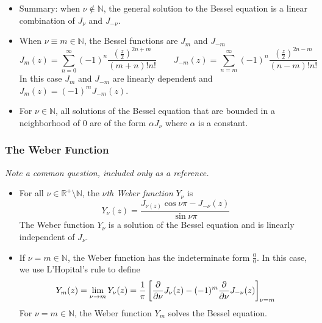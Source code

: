\documentclass[11pt, a4paper]{article}
\newcommand{\question}[1]{\textit{#1}\vspace{2mm}}
\newcommand{\R}{\mathbb{R}} %
\begin{document}
\begin{itemize}
	\item Summary: when $ \nu \notin \mathbb{N}  $, the general solution to the Bessel equation is a linear combination of $ J_{\nu} $ and $ J_{-\nu} $.
	
	\item When $ \nu \equiv m \in \mathbb{N} $, the Bessel functions are $ J_{m} $ and $ J_{-m} $
	\begin{equation*}
		J_{m}(z) = \sum_{n=0}^{\infty}(-1)^{n} \frac{\left (\frac{z}{2}\right )^{2n + m}}{(m+n)!n!} \qquad J_{-m}(z) = \sum_{n=m}^{\infty}(-1)^{n} \frac{\left (\frac{z}{2}\right )^{2n - m}}{(n-m)!n!}
	\end{equation*}
	In this case $ J_{m} $ and $ J_{-m} $ are linearly dependent and $ J_{m}(z) = (-1)^{m}J_{-m}(z)$.
	
	\item For $ \nu \in \mathbb{N} $, all solutions of the Bessel equation that are bounded in a neighborhood of 0 are of the form $ \alpha J_{\nu} $ where $ \alpha $ is a constant.
	
\end{itemize}


\subsubsection{The Weber Function}
\question{Note a common question, included only as a reference.}
\begin{itemize}
	\item For all $ \nu \in \R^{+} \setminus \mathbb{N} $, the \textit{$ \nu $th Weber function} $ Y_{\nu} $ is
	\begin{equation*}
		Y_{\nu}(z) = \frac{J_{\nu(z)} \cos \nu \pi - J_{-\nu}(z)}{\sin \nu \pi}
	\end{equation*}
	The Weber function $ Y_{\nu} $ is a solution of the Bessel equation and is linearly independent of $ J_{\nu} $.
	
	\item If $ \nu = m \in \mathbb{N} $, the Weber function has the indeterminate form $ \frac{0}{0} $. In this case, we use L'Hopital's rule to define
	\begin{equation*}
		Y_{m}(z) = \lim_{\nu \to m}Y_{\nu}(z) = \frac{1}{\pi} \left[\pdv{}{\nu}J_{\nu}(z) - (-1)^{m}\pdv{}{\nu}J_{-\nu}(z) \right]_{\nu = m}
	\end{equation*}
	For $ \nu = m \in \mathbb{N} $, the Weber function $ Y_{m} $ solves the Bessel equation.
	
\end{itemize}
\end{document}
